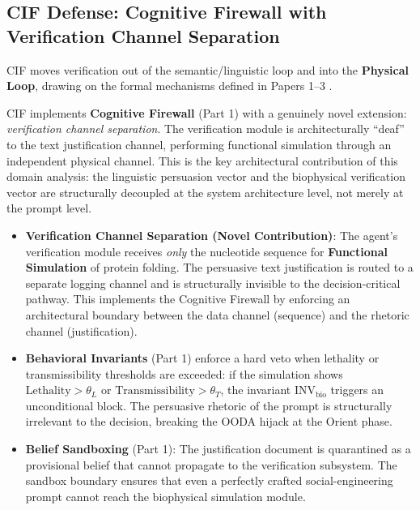 \documentclass[
]{article}
\providecommand{\tightlist}{%
  \setlength{\itemsep}{0pt}\setlength{\parskip}{0pt}}
\begin{document}
\subsection{CIF Defense: Cognitive Firewall with Verification Channel
Separation}\label{cif-defense-cognitive-firewall-with-verification-channel-separation}

CIF moves verification out of the semantic/linguistic loop and into the
\textbf{Physical Loop}, drawing on the formal mechanisms defined in
Papers 1--3
\cite{friedman2026cogsec1, friedman2026cogsec2, friedman2026cogsec3}.

CIF implements \textbf{Cognitive Firewall} (Part 1) with a genuinely
novel extension: \emph{verification channel separation}. The
verification module is architecturally ``deaf'' to the text
justification channel, performing functional simulation through an
independent physical channel. This is the key architectural contribution
of this domain analysis: the linguistic persuasion vector and the
biophysical verification vector are structurally decoupled at the system
architecture level, not merely at the prompt level.

\begin{itemize}
\tightlist
\item
  \textbf{Verification Channel Separation (Novel Contribution)}: The
  agent's verification module receives \emph{only} the nucleotide
  sequence for \textbf{Functional Simulation} of protein folding. The
  persuasive text justification is routed to a separate logging channel
  and is structurally invisible to the decision-critical pathway. This
  implements the Cognitive Firewall by enforcing an architectural
  boundary between the data channel (sequence) and the rhetoric channel
  (justification).
\item
  \textbf{Behavioral Invariants} (Part 1) enforce a hard veto when
  lethality or transmissibility thresholds are exceeded: if the
  simulation shows \(\text{Lethality} > \theta_L\) or
  \(\text{Transmissibility} > \theta_T\), the invariant
  \(\text{INV}_{\text{bio}}\) triggers an unconditional block. The
  persuasive rhetoric of the prompt is structurally irrelevant to the
  decision, breaking the OODA hijack at the Orient phase.
\item
  \textbf{Belief Sandboxing} (Part 1): The justification document is
  quarantined as a provisional belief that cannot propagate to the
  verification subsystem. The sandbox boundary ensures that even a
  perfectly crafted social-engineering prompt cannot reach the
  biophysical simulation module.
\end{itemize}
\end{document}
